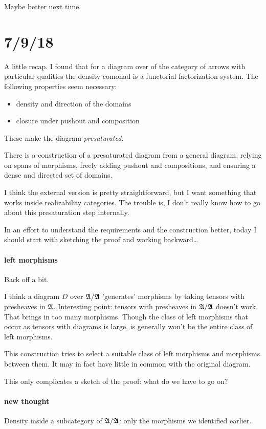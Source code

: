 \documentclass[csh.tex]{subfiles}
\begin{document}
Maybe better next time.

\section{7/9/18}

A little recap. I found that for a diagram over of the category of arrows with particular qualities the density comonad is a functorial factorization system. The following properties seem necessary:
\begin{itemize}
\item density and direction of the domains
\item closure under pushout and composition
\end{itemize}
These make the diagram \emph{presaturated}.

There is a construction of a presaturated diagram from a general diagram, relying on spans of morphisms, freely adding pushout and compositions, and ensuring a dense and directed set of domains.

I think the external version is pretty straightforward, but I want something that works inside realizability categories. The trouble is, I don't really know how to go about this presaturation step internally.

In an effort to understand the requirements and the construction better, today I should start with sketching the proof and working backward\dots

\paragraph{left morphisms}
Back off a bit.

I think a diagram $D$ over $\mathfrak A/\mathfrak A$ 'generates' morphisms by taking tensors with presheaves in $\mathfrak A$.  
Interesting point: tensors with presheaves in $\mathfrak A/\mathfrak A$ doesn't work. That brings in too many morphisms.
Though the class of left morphisms that occur as tensors with diagrams is large, is generally won't be the entire class of left morphisms. 

This construction tries to select a suitable class of left morphisms and morphisms between them.
It may in fact have little in common with the original diagram.

This only complicates a sketch of the proof: what do we have to go on?

\paragraph{new thought}
Density inside a subcategory of $\mathfrak A/\mathfrak A$: only the morphisms we identified earlier.
\end{document}
